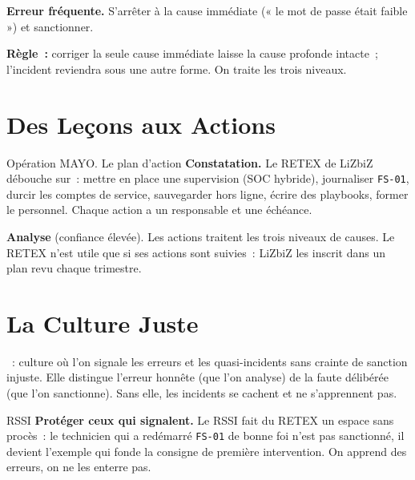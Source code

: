 \begin{boxalert}
\textbf{Erreur fréquente.} S'arrêter à la cause immédiate (« le mot de passe
était faible ») et sanctionner.

\smallskip
\textbf{Règle~:} corriger la seule cause immédiate laisse la cause profonde
intacte~; l'incident reviendra sous une autre forme. On traite les trois
niveaux.
\end{boxalert}

\section{Des Leçons aux Actions}
\label{sec:c19-actions}

\begin{boxscenario}{Opération MAYO. Le plan d'action}
\textbf{Constatation.} Le RETEX de LiZbiZ débouche sur~: mettre en place une
supervision (SOC hybride), journaliser \texttt{FS-01}, durcir les comptes de
service, sauvegarder hors ligne, écrire des playbooks, former le personnel.
Chaque action a un responsable et une échéance.

\medskip
\textbf{Analyse} (confiance élevée). Les actions traitent les trois niveaux
de causes. Le RETEX n'est utile que si ses actions sont suivies~: LiZbiZ les
inscrit dans un plan revu chaque trimestre.
\end{boxscenario}

\section{La Culture Juste}
\label{sec:c19-culture}

\begin{boxdef}
~: culture où l'on signale les erreurs et les
quasi-incidents sans crainte de sanction injuste. Elle distingue l'erreur
honnête (que l'on analyse) de la faute délibérée (que l'on sanctionne). Sans
elle, les incidents se cachent et ne s'apprennent pas.
\end{boxdef}

\begin{boxmetier}{RSSI}
\textbf{Protéger ceux qui signalent.} Le RSSI fait du RETEX un espace sans
procès~: le technicien qui a redémarré \texttt{FS-01} de bonne foi n'est pas
sanctionné, il devient l'exemple qui fonde la consigne de première
intervention. On apprend des erreurs, on ne les enterre pas.
\end{boxmetier}

